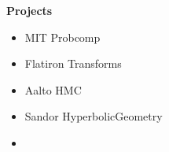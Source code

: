 \noindent \textbf{\Huge Projects}\\[0.3cm]

\begin{itemize}
    \item MIT Probcomp
    \item Flatiron Transforms
    \item Aalto HMC
    \item Sandor HyperbolicGeometry
    \item 
\end{itemize}